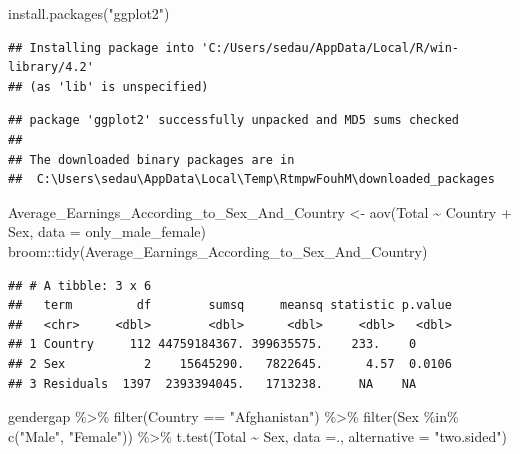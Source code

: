 \documentclass[
]{article}
\newenvironment{Shaded}{\begin{snugshade}}{\end{snugshade}}
\newcommand{\AttributeTok}[1]{\textcolor[rgb]{0.77,0.63,0.00}{#1}}
\newcommand{\FunctionTok}[1]{\textcolor[rgb]{0.00,0.00,0.00}{#1}}
\newcommand{\NormalTok}[1]{#1}
\newcommand{\OtherTok}[1]{\textcolor[rgb]{0.56,0.35,0.01}{#1}}
\newcommand{\SpecialCharTok}[1]{\textcolor[rgb]{0.00,0.00,0.00}{#1}}
\newcommand{\StringTok}[1]{\textcolor[rgb]{0.31,0.60,0.02}{#1}}
\begin{document}
\begin{Shaded}
\begin{Highlighting}[]
  \FunctionTok{install.packages}\NormalTok{(}\StringTok{"ggplot2"}\NormalTok{)}
\end{Highlighting}
\end{Shaded}

\begin{verbatim}
## Installing package into 'C:/Users/sedau/AppData/Local/R/win-library/4.2'
## (as 'lib' is unspecified)
\end{verbatim}

\begin{verbatim}
## package 'ggplot2' successfully unpacked and MD5 sums checked
## 
## The downloaded binary packages are in
##  C:\Users\sedau\AppData\Local\Temp\RtmpwFouhM\downloaded_packages
\end{verbatim}

\begin{Shaded}
\begin{Highlighting}[]
\NormalTok{Average\_Earnings\_According\_to\_Sex\_And\_Country }\OtherTok{\textless{}{-}} \FunctionTok{aov}\NormalTok{(Total }\SpecialCharTok{\textasciitilde{}}\NormalTok{ Country }\SpecialCharTok{+}\NormalTok{ Sex, }\AttributeTok{data =}\NormalTok{ only\_male\_female)}
\NormalTok{broom}\SpecialCharTok{::}\FunctionTok{tidy}\NormalTok{(Average\_Earnings\_According\_to\_Sex\_And\_Country)  }
\end{Highlighting}
\end{Shaded}

\begin{verbatim}
## # A tibble: 3 x 6
##   term         df        sumsq     meansq statistic p.value
##   <chr>     <dbl>        <dbl>      <dbl>     <dbl>   <dbl>
## 1 Country     112 44759184367. 399635575.    233.    0     
## 2 Sex           2    15645290.   7822645.      4.57  0.0106
## 3 Residuals  1397  2393394045.   1713238.     NA    NA
\end{verbatim}

\begin{Shaded}
\begin{Highlighting}[]
\NormalTok{gendergap }\SpecialCharTok{\%\textgreater{}\%}
  \FunctionTok{filter}\NormalTok{(Country }\SpecialCharTok{==} \StringTok{"Afghanistan"}\NormalTok{) }\SpecialCharTok{\%\textgreater{}\%}
\FunctionTok{filter}\NormalTok{(Sex }\SpecialCharTok{\%in\%} \FunctionTok{c}\NormalTok{(}\StringTok{"Male"}\NormalTok{, }\StringTok{"Female"}\NormalTok{)) }\SpecialCharTok{\%\textgreater{}\%}
  \FunctionTok{t.test}\NormalTok{(Total }\SpecialCharTok{\textasciitilde{}}\NormalTok{ Sex, }\AttributeTok{data =}\NormalTok{., }\AttributeTok{alternative =} \StringTok{"two.sided"}\NormalTok{)}
\end{Highlighting}
\end{Shaded}
\end{document}
